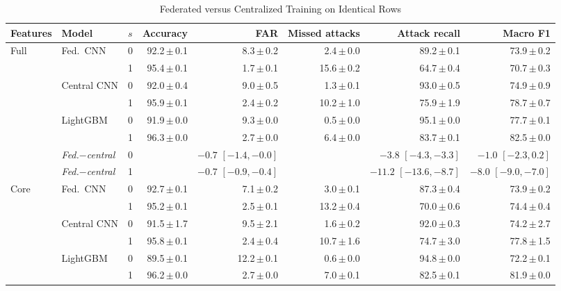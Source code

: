 \begin{table}[t]
\centering
\scriptsize
\caption{Federated versus Centralized Training on Identical Rows}
\label{tab:fedcentral}
\setlength{\tabcolsep}{3pt}
\begin{tabular}{lllrrrrr}
\toprule
Features & Model & $s$ & Accuracy & FAR & Missed attacks & Attack recall & Macro F1 \\
\midrule
Full & Fed.\ CNN & 0 & 92.2{\,}$\pm${\,}0.1 & 8.3{\,}$\pm${\,}0.2 & 2.4{\,}$\pm${\,}0.0 & 89.2{\,}$\pm${\,}0.1 & 73.9{\,}$\pm${\,}0.2 \\
 &  & 1 & 95.4{\,}$\pm${\,}0.1 & 1.7{\,}$\pm${\,}0.1 & 15.6{\,}$\pm${\,}0.2 & 64.7{\,}$\pm${\,}0.4 & 70.7{\,}$\pm${\,}0.3 \\
 & Central CNN & 0 & 92.0{\,}$\pm${\,}0.4 & 9.0{\,}$\pm${\,}0.5 & 1.3{\,}$\pm${\,}0.1 & 93.0{\,}$\pm${\,}0.5 & 74.9{\,}$\pm${\,}0.9 \\
 &  & 1 & 95.9{\,}$\pm${\,}0.1 & 2.4{\,}$\pm${\,}0.2 & 10.2{\,}$\pm${\,}1.0 & 75.9{\,}$\pm${\,}1.9 & 78.7{\,}$\pm${\,}0.7 \\
 & LightGBM & 0 & 91.9{\,}$\pm${\,}0.0 & 9.3{\,}$\pm${\,}0.0 & 0.5{\,}$\pm${\,}0.0 & 95.1{\,}$\pm${\,}0.0 & 77.7{\,}$\pm${\,}0.1 \\
 &  & 1 & 96.3{\,}$\pm${\,}0.0 & 2.7{\,}$\pm${\,}0.0 & 6.4{\,}$\pm${\,}0.0 & 83.7{\,}$\pm${\,}0.1 & 82.5{\,}$\pm${\,}0.0 \\
 & \emph{Fed.$-$central} & 0 & & $-0.7$ $[-1.4, -0.0]$ & & $-3.8$ $[-4.3, -3.3]$ & $-1.0$ $[-2.3, 0.2]$ \\
 & \emph{Fed.$-$central} & 1 & & $-0.7$ $[-0.9, -0.4]$ & & $-11.2$ $[-13.6, -8.7]$ & $-8.0$ $[-9.0, -7.0]$ \\
\midrule
Core & Fed.\ CNN & 0 & 92.7{\,}$\pm${\,}0.1 & 7.1{\,}$\pm${\,}0.2 & 3.0{\,}$\pm${\,}0.1 & 87.3{\,}$\pm${\,}0.4 & 73.9{\,}$\pm${\,}0.2 \\
 &  & 1 & 95.2{\,}$\pm${\,}0.1 & 2.5{\,}$\pm${\,}0.1 & 13.2{\,}$\pm${\,}0.4 & 70.0{\,}$\pm${\,}0.6 & 74.4{\,}$\pm${\,}0.4 \\
 & Central CNN & 0 & 91.5{\,}$\pm${\,}1.7 & 9.5{\,}$\pm${\,}2.1 & 1.6{\,}$\pm${\,}0.2 & 92.0{\,}$\pm${\,}0.3 & 74.2{\,}$\pm${\,}2.7 \\
 &  & 1 & 95.8{\,}$\pm${\,}0.1 & 2.4{\,}$\pm${\,}0.4 & 10.7{\,}$\pm${\,}1.6 & 74.7{\,}$\pm${\,}3.0 & 77.8{\,}$\pm${\,}1.5 \\
 & LightGBM & 0 & 89.5{\,}$\pm${\,}0.1 & 12.2{\,}$\pm${\,}0.1 & 0.6{\,}$\pm${\,}0.0 & 94.8{\,}$\pm${\,}0.0 & 72.2{\,}$\pm${\,}0.1 \\
 &  & 1 & 96.2{\,}$\pm${\,}0.0 & 2.7{\,}$\pm${\,}0.0 & 7.0{\,}$\pm${\,}0.1 & 82.5{\,}$\pm${\,}0.1 & 81.9{\,}$\pm${\,}0.0 \\

\end{tabular}
\end{table}
